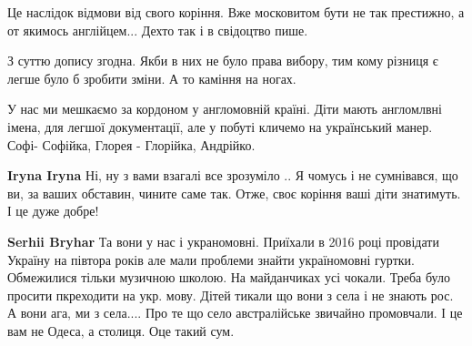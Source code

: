 \begin{itemize}
\begin{itemize}
\end{itemize}

 

Це наслідок відмови від свого коріння. Вже московитом бути не так престижно, а
от якимось англійцем... Дехто так і в свідоцтво пише.


 

З суттю допису згодна. Якби в них не було права вибору, тим кому різниця є
легше було б зробити зміни. А то каміння на ногах.


 

У нас ми мешкаємо за кордоном у англомовній країні. Діти мають англомлвні
імена, для легшої документації, але у побуті кличемо на український манер.
Софі- Софійка, Глорея - Глорійка, Андрійко.

\begin{itemize}
 
\textbf{Iryna Iryna} Ні, ну з вами взагалі все зрозуміло \Smiley[1.0][yellow].. Я чомусь і не
сумнівався, що ви, за ваших обставин, чините саме так. Отже, своє коріння ваші
діти знатимуть. І це дуже добре!

 
\textbf{Serhii Bryhar} Та вони у нас і украномовні. Приїхали в 2016 році
провідати Україну на півтора років але мали проблеми знайти україномовні
гуртки. Обмежилися тільки музичною школою. На майданчиках усі чокали. Треба
було просити пкреходити на укр. мову. Дітей тикали що вони з села і не знають
рос. А вони ага, ми з села.... Про те що село австралійське звичайно
промовчали. І це вам не Одеса, а столиця. Оце такий сум.
\end{itemize}


\end{itemize}
